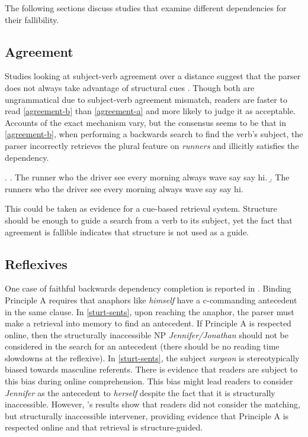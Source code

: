 \documentclass[12pt,letterpaper]{article}
\begin{document}
The following sections discuss studies that examine different dependencies for their fallibility. 

\subsection{Agreement}

Studies looking at subject-verb agreement over a distance suggest that the parser does not always take advantage of structural cues \citep{pearlmutter99, wagers09, alcocer09}. Though both are ungrammatical due to subject-verb agreement mismatch, readers are faster to read \ref{agreement-b} than \ref{agreement-a} and more likely to judge it as acceptable. Accounts of the exact mechanism vary, but the consensus seems to be that in \ref{agreement-b}, when performing a backwards search to find the verb's subject, the parser incorrectly retrieves the plural feature on \emph{runners} and illicitly satisfies the dependency. 

\ex.  \a. The runner  who the driver see every morning always wave say say hi. \label{agreement-a}
      \b. The runners who the driver see every morning always wave say say hi. \label{agreement-b}


This could be taken as evidence for a cue-based retrieval system. Structure should be enough to guide a search from a verb to its subject, yet the fact that agreement is fallible indicates that structure is not used as a guide.

\subsection{Reflexives}

One case of faithful backwards dependency completion is reported in \citet{sturt03}. Binding Principle A \cite{chomsky81} requires that anaphors like \emph{himself} have a c-commanding antecedent in the same clause. In \ref{sturt-sents}, upon reaching the anaphor, the parser must make a retrieval into memory to find an antecedent. If Principle A is respected online, then the structurally inaccessible NP \emph{Jennifer/Jonathan} should not be considered in the search for an antecedent (there should be no reading time slowdowns at the reflexive). In \ref{sturt-sents}, the subject \emph{surgeon} is stereotypically biased towards masculine referents. There is evidence that readers are subject to this bias during online comprehension. This bias might lead readers to consider \emph{Jennifer} as the antecedent to \emph{herself} despite the fact that it is structurally inaccessible. However, \citeauthor{sturt03}'s results show that readers did not consider the matching, but structurally inaccessible intervener, providing evidence that Principle A is respected online and that retrieval is structure-guided.
\end{document}

